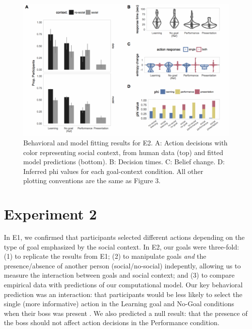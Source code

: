 \documentclass[10pt, letterpaper]{article}
\newenvironment{CodeChunk}{}{}
\begin{document}
\begin{CodeChunk}
\begin{figure}[tb]

{\centering \includegraphics[width=0.95\linewidth]{figs/e2_results-1} 

}

\caption[Behavioral and model fitting results for E2]{Behavioral and model fitting results for E2. A: Action decisions with color representing social context, from human data (top) and fitted model predictions (bottom). B: Decision times. C: Belief change. D: Inferred phi values for each goal-context condition. All other plotting conventions are the same as Figure 3.}\label{fig:e2_results}
\end{figure}
\end{CodeChunk}

\section{Experiment 2}\label{experiment-2}

In E1, we confirmed that participants selected different actions
depending on the type of goal emphasized by the social context. In E2,
our goals were three-fold: (1) to replicate the results from E1; (2) to
manipulate goals \emph{and} the presence/absence of another person
(social/no-social) indepently, allowing us to measure the interaction
between goals and social context; and (3) to compare empirical data with
predictions of our computational model. Our key behavioral prediction
was an interaction: that participants would be less likely to select the
single (more informative) action in the Learning goal and No-Goal
conditions when their boss was present . We also predicted a null
result: that the presence of the boss should not affect action decisions
in the Performance condition.
\end{document}
